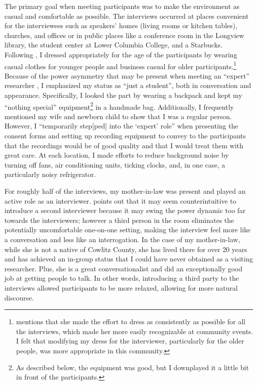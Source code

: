 The primary goal when meeting participants was to make the environment as casual and comfortable as possible. The interviews occurred at places convenient for the interviewees such as speakers’ homes (living rooms or kitchen tables), churches, and offices or in public places like a conference room in the Longview library, the student center at Lower Columbia College, and a Starbucks. Following \citet{feagin_2013}, I dressed appropriately for the age of the participants by wearing casual clothes for younger people and business casual for older participants.\footnote{\citet[37]{hall_lew_2009_diss} mentions that she made the effort to dress as consistently as possible for all the interviews, which made her more easily recognizable at community events. I felt that modifying my dress for the interviewer, particularly for the older people, was more appropriate in this community.} Because of the power asymmetry that may be present when meeting an ``expert'' researcher \citep[197]{schlling_2013}, I emphasized my status as ``just a student'', both in conversation and appearance. Specifically, I looked the part by wearing a backpack and kept my ``nothing special'' equipment\footnote{As described below, the equipment was good, but I downplayed it a little bit in front of the participants.} in a handmade bag. Additionally, I frequently mentioned my wife and newborn child to show that I was a regular person. However, I ``temporarily step[ped] into the `expert' role'' \citep[236]{schlling_2013} when presenting the consent forms and setting up recording equipment to convey to the participants that the recordings would be of good quality and that I would treat them with great care. At each location, I made efforts to reduce background noise by turning off fans, air conditioning units, ticking clocks, and, in one case, a particularly noisy refrigerator.

For roughly half of the interviews, my mother-in-law was present and played an active role as an interviewer. \citet[110]{schlling_2013} points out that it may seem counterintuitive to introduce a second interviewer because it may swing the power dynamic too far towards the interviewers; however a third person in the room eliminates the potentially uncomfortable one-on-one setting, making the interview feel more like a conversation and less like an interrogation. In the case of my mother-in-law, while she is not a native of Cowlitz County, she has lived there for over 20 years and has achieved an in-group status that I could have never obtained as a visiting researcher. Plus, she is a great conversationalist and did an exceptionally good job at getting people to talk. In other words, introducing a third party to the interviews allowed participants to be more relaxed, allowing for more natural discourse.


